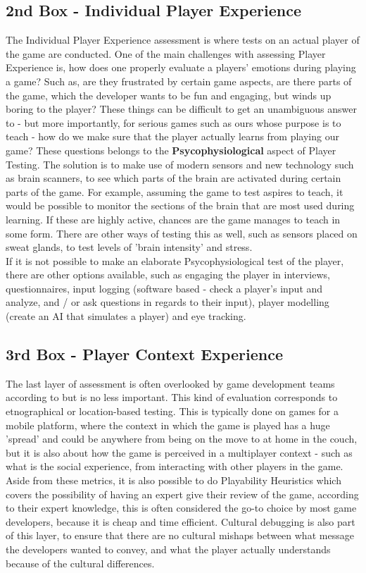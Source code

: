 \subsection{2nd Box - Individual Player Experience}
The Individual Player Experience assessment is where tests on an actual player of the game are conducted.
One of the main challenges with assessing Player Experience is, how does one properly evaluate a players' emotions during playing a game?
Such as, are they frustrated by certain game aspects, are there parts of the game, which the developer wants to be fun and engaging, but winds up boring to the player?
These things can be difficult to get an unambiguous answer to - but more importantly, for serious games such as ours whose purpose is to teach - how do we make sure that the player actually learns from playing our game?
These questions belongs to the \textbf{Psycophysiological} aspect of Player Testing.
The solution is to make use of modern sensors and new technology such as brain scanners, to see which parts of the brain are activated during certain parts of the game.
For example, assuming the game to test aspires to teach, it would be possible to monitor the sections of the brain that are most used during learning.
If these are highly active, chances are the game manages to teach in some form.
There are other ways of testing this as well, such as sensors placed on sweat glands, to test levels of 'brain intensity' and stress.\\

If it is not possible to make an elaborate Psycophysiological test of the player, there are other options available, such as engaging the player in interviews, questionnaires, input logging (software based - check a player's input and analyze, and / or ask questions in regards to their input), player modelling (create an AI that simulates a player) and eye tracking.


\subsection{3rd Box - Player Context Experience}
The last layer of assessment is often overlooked by game development teams according to  but is no less important.
This kind of evaluation corresponds to etnographical or location-based testing.
This is typically done on games for a mobile platform, where the context in which the game is played has a huge 'spread' and could be anywhere from being on the move to at home in the couch, but it is also about how the game is perceived in a multiplayer context - such as what is the social experience, from interacting with other players in the game.
Aside from these metrics, it is also possible to do Playability Heuristics which covers the possibility of having an expert give their review of the game, according to their expert knowledge, this is often considered the go-to choice by most game developers, because it is cheap and time efficient.
Cultural debugging is also part of this layer, to ensure that there are no cultural mishaps between what message the developers wanted to convey, and what the player actually understands because of the cultural differences.

